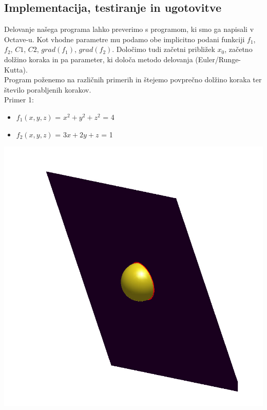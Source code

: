 \documentclass[]{article}
\begin{document}
\subsection{Implementacija, testiranje in ugotovitve}
	Delovanje našega programa lahko preverimo s programom, ki smo ga napisali v Octave-u. Kot vhodne parametre mu podamo obe implicitno podani funkciji $f_{1}$, $f_{2}$, $C1$, $C2$, $grad(f_{1})$, $grad(f_{2})$. Določimo tudi začetni približek $x_{0}$, začetno dolžino koraka in pa parameter, ki določa metodo delovanja (Euler/Runge-Kutta).\\
	Program poženemo na različnih primerih in štejemo povprečno dolžino koraka ter število porabljenih korakov.\\
	Primer 1:
	\begin{itemize} 
		\item $f_{1}(x,y,z)$ = $x^2 + y^2 + z^2$ = 4
		\item $f_{2}(x,y,z)$ = $3x + 2y + z$ = 1	
	\end{itemize}
	\includegraphics[scale=0.3]{primer1_1}
\end{document}
